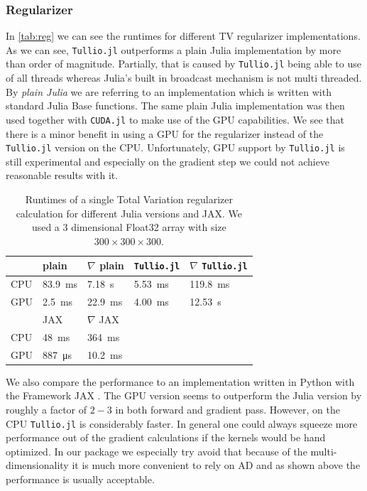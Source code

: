 \documentclass{juliacon}
\begin{document}
        \subsubsection{Regularizer}
            In \autoref{tab:reg} we can see the runtimes for different TV regularizer implementations. As we can see, \verb|Tullio.jl| outperforms a plain 
            Julia implementation by more than order of magnitude. Partially, that is caused by \verb|Tullio.jl|
            being able to 
            use of all threads whereas Julia's built in broadcast mechanism is not multi threaded.
            By \textit{plain Julia} we are referring to an implementation which is written with standard Julia Base functions.
            The same plain Julia implementation was then used together with \verb|CUDA.jl|
            to make use of the GPU capabilities. We see that there is a minor benefit in using a GPU for the regularizer instead of 
            the \verb|Tullio.jl| version on the CPU. Unfortunately, GPU support by \verb|Tullio.jl| is still experimental and especially on the gradient step 
            we could not achieve reasonable results with it.
            \begin{table}[h]
                \begin{tabular}{l l l l l}
                    & plain & $\nabla$ plain & \verb|Tullio.jl| & $\nabla$ \verb|Tullio.jl| \\
                \hline
                CPU & \SI{83.9}{\milli\second} & \SI{7.18}{\second} & \SI{5.53}{\milli\second}  & \SI{119.8}{\milli\second}   \\ 
                GPU & \SI{2.5}{\milli\second}  & \SI{22.9}{\milli\second}& \SI{4.00}{\milli\second}  & \SI{12.53}{\second} \\
                \hline
                \hline
                    & JAX & $\nabla$ JAX && \\
                \hline
                CPU & \SI{48}{\milli\second}   & \SI{364}{\milli\second}&   & \\
                GPU & \SI{887}{\micro\second}   & \SI{10.2}{\milli\second}&   &
                \end{tabular}
                \caption{Runtimes of a single Total Variation regularizer calculation for different Julia versions and JAX. 
                    We used a 3 dimensional Float32 array with size $300 \times 300 \times 300$.  }
                \label{tab:reg}
            \end{table}
            We also compare the performance to an implementation written in Python with the Framework JAX \cite{jax2018github}. 
            The GPU version seems to outperform the Julia version by roughly a factor of $2 - 3$ in both forward and gradient pass.
            However, on the CPU \verb|Tullio.jl| is considerably faster. 
            In general one could always squeeze more performance out of the gradient calculations if the kernels would be hand optimized.
            In our package we especially try avoid that because of the multi-dimensionality it is much more convenient
            to rely on AD and as shown above the performance is usually acceptable.
\end{document}
